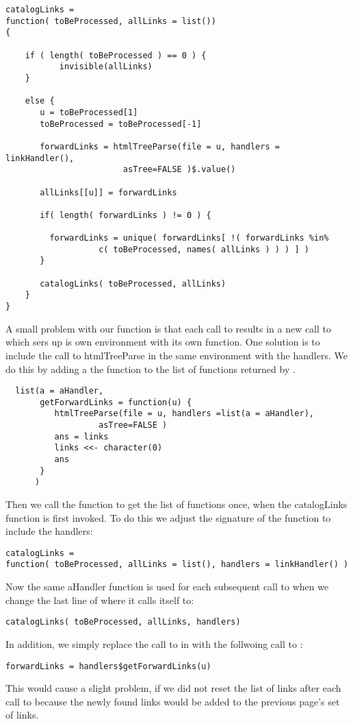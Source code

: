 \small{
\begin{verbatim}
catalogLinks =
function( toBeProcessed, allLinks = list())
{

    if ( length( toBeProcessed ) == 0 ) {
           invisible(allLinks)
    }

    else {
       u = toBeProcessed[1]
       toBeProcessed = toBeProcessed[-1]

       forwardLinks = htmlTreeParse(file = u, handlers = linkHandler(),
                        asTree=FALSE )$.value()
                                                                                     
       allLinks[[u]] = forwardLinks

       if( length( forwardLinks ) != 0 ) {

         forwardLinks = unique( forwardLinks[ !( forwardLinks %in%
                   c( toBeProcessed, names( allLinks ) ) ) ] )
       }

       catalogLinks( toBeProcessed, allLinks)
    }
}
\end{verbatim}
}

A small problem with our function is that each call to 
 results in a new call to 
 which sers up is own environment
with its own  function.
One solution is to include the call to htmlTreeParse in the 
same environment with the handlers.
We do this by adding a the function 
to the list of functions returned by .

\begin{verbatim}
  list(a = aHandler,
       getForwardLinks = function(u) {
          htmlTreeParse(file = u, handlers =list(a = aHandler),
                   asTree=FALSE )
          ans = links
          links <<- character(0)
          ans
       }
      )
\end{verbatim}

Then we call the  function
to get the list of functions once, when the catalogLinks
function is first invoked.
To do this we adjust the signature of the function to include the 
handlers:
\begin{verbatim}
catalogLinks =
function( toBeProcessed, allLinks = list(), handlers = linkHandler() )
\end{verbatim}
Now the same aHandler function is used for each subsequent call to
 when we change the last line of 
where it calls itself to:
\begin{verbatim}
catalogLinks( toBeProcessed, allLinks, handlers)
\end{verbatim}
In addition, we simply replace the call to  in
 with the follwoing call to :
\begin{verbatim}
forwardLinks = handlers$getForwardLinks(u)
\end{verbatim}
This would cause a slight problem, if we did not reset
the list of links after each call to 
because the newly found links would be added to the previous page's 
set of links. 

